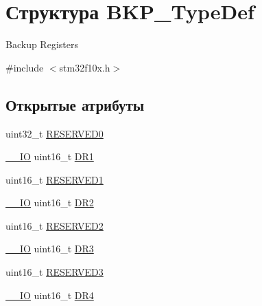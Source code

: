 \hypertarget{struct_b_k_p___type_def}{}\section{Структура B\+K\+P\+\_\+\+Type\+Def}
\label{struct_b_k_p___type_def}


Backup Registers ~\newline
  




{\ttfamily \#include $<$stm32f10x.\+h$>$}

\subsection*{Открытые атрибуты}
\begin{DoxyCompactItemize}
\item 
uint32\+\_\+t \mbox{\hyperlink{struct_b_k_p___type_def_a8b41b52d05011ff2ed2b85977ea20413}{R\+E\+S\+E\+R\+V\+E\+D0}}
\item 
\mbox{\hyperlink{group___c_m_s_i_s___c_m3__core__definitions_gaec43007d9998a0a0e01faede4133d6be}{\+\_\+\+\_\+\+IO}} uint16\+\_\+t \mbox{\hyperlink{struct_b_k_p___type_def_aaa1a907c0aaf85c6de3aa3d829a07a3a}{D\+R1}}
\item 
uint16\+\_\+t \mbox{\hyperlink{struct_b_k_p___type_def_a0d818c25d71abdfc33e9d3d905a0f5f2}{R\+E\+S\+E\+R\+V\+E\+D1}}
\item 
\mbox{\hyperlink{group___c_m_s_i_s___c_m3__core__definitions_gaec43007d9998a0a0e01faede4133d6be}{\+\_\+\+\_\+\+IO}} uint16\+\_\+t \mbox{\hyperlink{struct_b_k_p___type_def_a98d088136a3ba92025a8381d9a19f7b0}{D\+R2}}
\item 
uint16\+\_\+t \mbox{\hyperlink{struct_b_k_p___type_def_ae9cc232260bb14cfbdb0ecee85b2be50}{R\+E\+S\+E\+R\+V\+E\+D2}}
\item 
\mbox{\hyperlink{group___c_m_s_i_s___c_m3__core__definitions_gaec43007d9998a0a0e01faede4133d6be}{\+\_\+\+\_\+\+IO}} uint16\+\_\+t \mbox{\hyperlink{struct_b_k_p___type_def_a034cf532a9752513de879c0f4ff38d0a}{D\+R3}}
\item 
uint16\+\_\+t \mbox{\hyperlink{struct_b_k_p___type_def_a3a3f66ad2e85c6d29e9d282cf19d193e}{R\+E\+S\+E\+R\+V\+E\+D3}}
\item 
\mbox{\hyperlink{group___c_m_s_i_s___c_m3__core__definitions_gaec43007d9998a0a0e01faede4133d6be}{\+\_\+\+\_\+\+IO}} uint16\+\_\+t \mbox{\hyperlink{struct_b_k_p___type_def_a02abe76a58a7f018ea450221c955ab30}{D\+R4}}
\item 

\end{DoxyCompactItemize}
